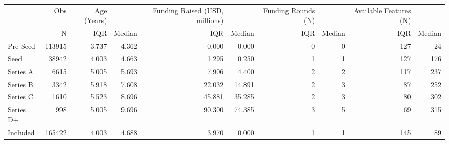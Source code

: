 \begin{tabular}{lrrrrrrrrr}
\toprule
{} &     Obs & Age (Years) &        & Funding Raised (USD, millions) &         & Funding Rounds (N) &        & Available Features (N) &        \\
{} &       N &         IQR & Median &                            IQR &  Median &                IQR & Median &                    IQR & Median \\
\midrule
Pre-Seed  &  113915 &       3.737 &  4.362 &                          0.000 &   0.000 &                  0 &      0 &                    127 &     24 \\
Seed      &   38942 &       4.003 &  4.663 &                          1.295 &   0.250 &                  1 &      1 &                    127 &    176 \\
Series A  &    6615 &       5.005 &  5.693 &                          7.906 &   4.400 &                  2 &      2 &                    117 &    237 \\
Series B  &    3342 &       5.918 &  7.608 &                         22.032 &  14.891 &                  2 &      3 &                     87 &    252 \\
Series C  &    1610 &       5.523 &  8.696 &                         45.881 &  35.285 &                  2 &      3 &                     80 &    302 \\
Series D+ &     998 &       5.005 &  9.696 &                         90.300 &  74.385 &                  3 &      5 &                     69 &    315 \\
Included  &  165422 &       4.003 &  4.688 &                          3.970 &   0.000 &                  1 &      1 &                    145 &     89 \\
\bottomrule
\end{tabular}
